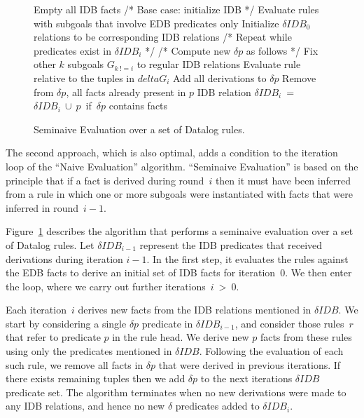 \begin{figure}
\ssp
\begin{boxedminipage}{\linewidth}
    \begin{algorithmic}[1]
      	\STATE Empty all IDB facts
	\STATE /* Base case: initialize IDB */
        \STATE Evaluate rules with subgoals that involve EDB predicates only
	\STATE Initialize $\delta IDB_0$ relations to be corresponding IDB relations
	\STATE /* Repeat while predicates exist in $\delta IDB_i$ */
                	\STATE /* Compute new $\delta p$ as follows */
				\STATE Fix other $k$ subgoals $G_{k\ != i}$ to regular IDB relations
				\STATE Evaluate rule relative to the tuples in $delta G_i$ 
				\STATE Add all derivations to $\delta p$
			\ENDFOR
        	\ENDFOR
		\STATE Remove from $\delta p$, all facts already present in $p$ IDB relation
		\STATE $\delta IDB_i$\ =\ $\delta IDB_i\ \cup\ p$\ if\ $\delta p$ contains facts
        \ENDFOR
	\ENDWHILE
    \end{algorithmic}
\end{boxedminipage}
\caption{\label{ch:p2:fig:seminaive}Seminaive Evaluation over a set of Datalog rules.}
\end{figure}

The second approach, which is also optimal, adds a condition to the iteration
loop of the ``Naive Evaluation'' algorithm.  ``Seminaive Evaluation'' is based
on the principle that if a fact is derived during round~$i$ then it must have
been inferred from a rule in which one or more subgoals were instantiated with
facts that were inferred in round~$i-1$.  

Figure~\ref{ch:p2:fig:seminaive} describes the algorithm that performs a
seminaive evaluation over a set of Datalog rules.  Let $\delta IDB_{i-1}$
represent the IDB predicates that received derivations during iteration $i-1$.
In the first step, it evaluates the rules against the EDB facts to derive an
initial set of IDB facts for iteration~$0$.  We then enter the loop, where we
carry out further iterations~$i\ >\ 0$.

Each iteration~$i$ derives new facts from the IDB relations mentioned in
$\delta IDB$.  We start by considering a single $\delta p$ predicate in $\delta
IDB_{i-1}$, and consider those rules~$r$ that refer to predicate $p$ in the
rule head.  We derive new $p$ facts from these rules using only the predicates
mentioned in $\delta IDB$.  Following the evaluation of each such rule, we
remove all facts in $\delta p$ that were derived in previous iterations.  If
there exists remaining tuples then we add $\delta p$ to the next iterations
$\delta IDB$ predicate set.  The algorithm terminates when no new derivations
were made to any IDB relations, and hence no new $\delta$ predicates added to
$\delta IDB_i$.


